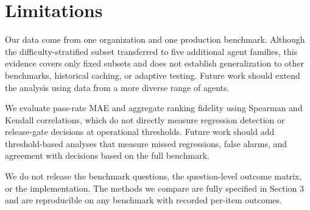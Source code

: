 \section*{Limitations}
\label{sec:limitations}

Our data come from one organization and one production benchmark. Although the
difficulty-stratified subset transferred to five additional agent families,
this evidence covers only fixed subsets and does not establish generalization
to other benchmarks, historical caching, or adaptive testing. Future work should extend the analysis using data from a more diverse range of agents.

We evaluate pass-rate MAE and aggregate ranking fidelity using Spearman and
Kendall correlations, which do not directly measure regression detection or
release-gate decisions at operational thresholds. Future work should add threshold-based analyses that measure missed regressions, false alarms, and agreement with decisions based on the full benchmark.

We do not release the benchmark questions, the question-level outcome matrix, or the implementation. The methods we compare are fully specified in Section 3 and are reproducible on any benchmark with recorded per-item outcomes.